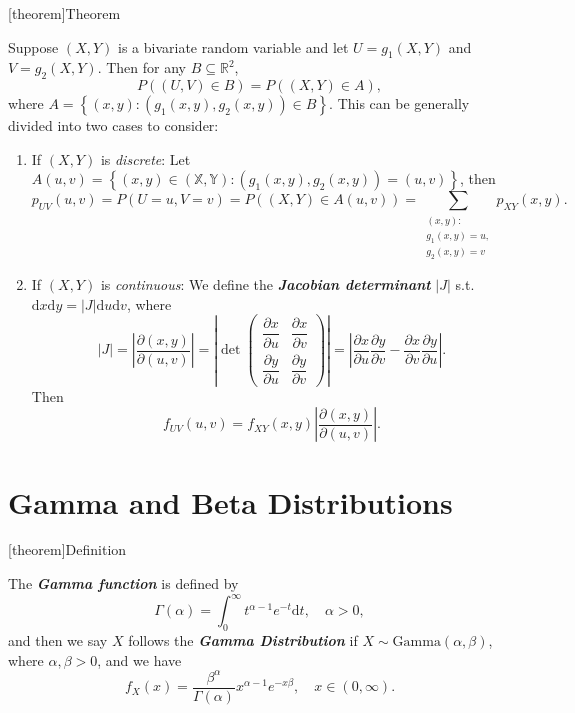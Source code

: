 \documentclass[12pt]{report}
\theoremstyle{definition}
\begin{document}
[theorem]{Theorem}
\begin{general bivariate transformation}
    Suppose $(X,Y)$ is a bivariate random variable and let $U=g_1(X,Y)$ and
    $V=g_2(X,Y)$. Then for any $B\subseteq\mathbb{R}^{2}$,
    \[
        P\left((U,V)\in B\right)=P\left((X,Y)\in A\right),
    \]
    where $A=\left\{(x,y):(g_1(x,y),g_2(x,y))\in B\right\}$.
    This can be generally divided into two cases to consider:
    \begin{enumerate}
        \item If $(X,Y)$ is \emph{discrete}: Let
            $A(u,v)=\left\{(x,y)\in(\mathbb{X},\mathbb{Y}):(g_1(x,y),g_2(x,y))=(u,v)\right\}$,
            then
            \[
                p_{UV}(u,v)=P(U=u,V=v)=P\left((X,Y)\in A(u,v)\right)
                =\sum_{\substack{(x,y):\\ g_1(x,y)=u,\\ g_2(x,y)=v}}p_{XY}(x,y).
            \]
        \item If $(X,Y)$ is \emph{continuous}: We define the
            \textbf{\emph{Jacobian determinant}} $|J|$ s.t.
            $\mathrm{d}x\mathrm{d}y=|J|\mathrm{d}u\mathrm{d}v$, where
            \[
                \renewcommand\arraystretch{2.1}
                |J|=\left|\frac{\partial(x,y)}{\partial(u,v)}\right|
                =\left|\det \begin{pmatrix}
                    \dfrac{\partial x}{\partial u} & \dfrac{\partial x}{\partial v} \\
                    \dfrac{\partial y}{\partial u} & \dfrac{\partial y}{\partial v}
                \end{pmatrix} \right|
                = \left|\frac{\partial x}{\partial u}\frac{\partial y}{\partial
                v}-\frac{\partial x}{\partial v}\frac{\partial y}{\partial
            u}\right|.
            \]
            Then
            \[
                f_{UV}(u,v)=f_{XY}(x,y)\left|\frac{\partial(x,y)}{\partial(u,v)}\right|.
            \]
    \end{enumerate} 
\end{general bivariate transformation}

\section{Gamma and Beta Distributions}

[theorem]{Definition}
\begin{gamma distributions}
    The \textbf{\emph{Gamma function}} is defined by
    \[
        \Gamma(\alpha)=\int_{0}^{\infty} t^{\alpha-1}e^{-t}\mathrm{d}t,\quad
        \alpha>0,
    \]
    and then we say $X$ follows the \textbf{\emph{Gamma Distribution}}
    if $X\sim\text{Gamma}(\alpha,\beta)$, where $\alpha,\beta>0$, and we have
    \[
        f_X(x)=\frac{\beta^{\alpha}}{\Gamma(\alpha)}x^{\alpha-1}e^{-x\beta},\quad 
        x\in(0,\infty).
    \]
\end{gamma distributions}
\end{document}

